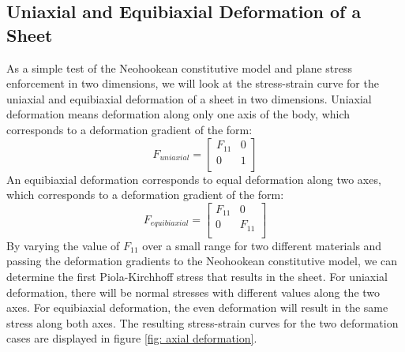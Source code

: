 \documentclass[]{spie}  %
\begin{document}
\subsection{Uniaxial and Equibiaxial Deformation of a Sheet}
As a simple test of the Neohookean constitutive model and plane stress enforcement in two dimensions, we will look at the stress-strain curve for the uniaxial and equibiaxial deformation of a sheet in two dimensions. Uniaxial deformation means deformation along only one axis of the body, which corresponds to a deformation gradient of the form:
\begin{equation}
F_{uniaxial} = 
\begin{bmatrix}
F_{11} & 0 \\
0 & 1  \\
\end{bmatrix}
\end{equation}
An equibiaxial deformation corresponds to equal deformation along two axes, which corresponds to a deformation gradient of the form:
\begin{equation}
F_{equibiaxial} = 
\begin{bmatrix}
	F_{11} & 0 \\
	0 & F_{11}  \\
\end{bmatrix}
\end{equation}
By varying the value of $F_{11}$ over a small range for two different materials and passing the deformation gradients to the Neohookean constitutive model, we can determine the first Piola-Kirchhoff stress that results in the sheet. For uniaxial deformation, there will be normal stresses with different values along the two axes. For equibiaxial deformation, the even deformation will result in the same stress along both axes. The resulting stress-strain curves for the two deformation cases are displayed in figure \ref{fig: axial deformation}. 
\end{document}
